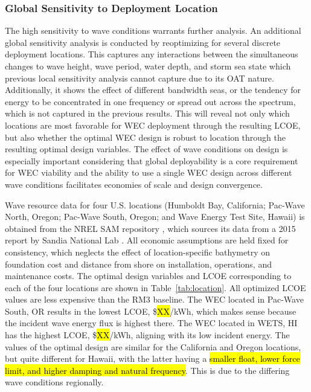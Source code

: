 
\subsubsection{Global Sensitivity to Deployment Location}
The high sensitivity to wave conditions warrants further analysis. An additional global sensitivity analysis is conducted by reoptimizing for several discrete deployment locations. This captures any interactions between the simultaneous changes to wave height, wave period, water depth, and storm sea state which previous local sensitivity analysis cannot capture due to its OAT nature. Additionally, it shows the effect of different bandwidth seas, or the tendency for energy to be concentrated in one frequency or spread out across the spectrum, which is not captured in the previous results. This will reveal not only which locations are most favorable for WEC deployment through the resulting LCOE, but also whether the optimal WEC design is robust to location through the resulting optimal design variables. The effect of wave conditions on design is especially important considering that global deployability is a core requirement for WEC viability \cite{bull_systems_2017} and the ability to use a single WEC design across different wave conditions facilitates economies of scale and design convergence.

Wave resource data for four U.S. locations (Humboldt Bay, California; Pac-Wave North, Oregon; Pac-Wave South, Oregon; and Wave Energy Test Site, Hawaii) is obtained from the NREL SAM repository \cite{janzou_sam_2022}, which sources its data from a 2015 report by Sandia National Lab \cite{dallman_characterization_2015}. All economic assumptions are held fixed for consistency, which neglects the effect of location-specific bathymetry on foundation cost and distance from shore on installation, operations, and maintenance costs. The optimal design variables and LCOE corresponding to each of the four locations are shown in Table~\ref{tab:location}. All optimized LCOE values are less expensive than the RM3 baseline. The WEC located in Pac-Wave South, OR results in the lowest LCOE, \$\hl{XX}/kWh, which makes sense because the incident wave energy flux is highest there. The WEC located in WETS, HI has the highest LCOE, \$\hl{XX}/kWh, aligning with its low incident energy. The values of the optimal design are similar for the California and Oregon locations, but quite different for Hawaii, with the latter having a \hl{smaller float, lower force limit, and higher damping and natural frequency}. This is due to the differing wave conditions regionally.

